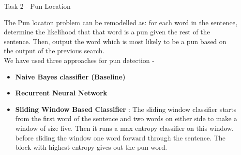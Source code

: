 \documentclass[final]{beamer}
\newlength{\onecolwid}
\newlength{\twocolwid}
\begin{document}
\begin{frame}[t]
\begin{columns}[t]
\begin{column}{\twocolwid}
			\begin{columns}[t,totalwidth=\twocolwid]
				\begin{column}{\onecolwid}
					\vspace{20mm}
					\begin{block}{Task 2 - Pun Location}
						{\large 
							The Pun locaton problem can be remodelled as: for each word in the sentence, determine the likelihood that that word is a pun given the rest of the sentence. Then, output the word which is most likely to be a pun based on the output of the previous search. \\
							We have used three approaches for pun detection - 
							\begin{itemize}
							\item {\textbf{Naive Bayes classifier (Baseline)}}
							\item {\textbf{Recurrent Neural Network} %
							}
							\item {\textbf{Sliding Window Based Classifier} : The sliding window classifier starts from the first word of the sentence and two words on either side to make a window of size five. Then it runs a max entropy classifier on this window, before sliding the window one word forward through the sentence. The block with highest entropy gives out the pun word.}
							\end{itemize}
							\\
						}
					\end{block}
				\end{column}
				\begin{column}{\onecolwid} %


\end{column}
\end{columns}
\end{column}
\end{columns}
\end{frame}
\end{document}
